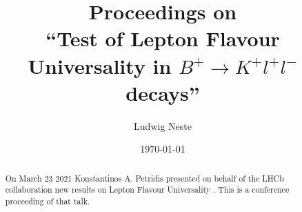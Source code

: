 \documentclass[%
 reprint,
 amsmath,amssymb,
 aps,
]{revtex4-2}
\begin{document}
\title{Proceedings on \\ \enquote{Test of Lepton Flavour Universality in $B^+\to K^+l^+l^- $ decays}}

\author{Ludwig Neste}
\date{\today}%

\begin{abstract}
	On March 23 2021 Konstantinos A. Petridis presented on behalf of the LHCb collaboration new results on 
	Lepton Flavour Universality \cite{petridis2021test}. 
	This is a conference proceeding of that talk.
\end{abstract}

\maketitle





\nocite{*}
\end{document}
